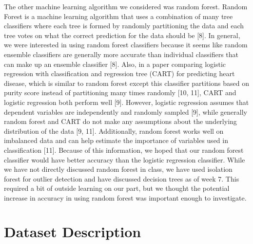 \documentclass[12pt]{article}
\begin{document}
The other machine learning algorithm we considered was random forest. Random Forest is a machine learning algorithm that uses a combination of many tree classifiers where each tree is formed by randomly partitioning the data and each tree votes on what the correct prediction for the data should be [8]. In general, we were interested in using random forest classifiers because it seems like random ensemble classifiers are generally more accurate than individual classifiers that can make up an ensemble classifier [8]. Also, in a paper comparing logistic regression with classification and regression tree (CART) for predicting heart disease, which is similar to random forest except this classifier partitions based on purity score instead of partitioning many times randomly [10, 11], CART and logistic regression both perform well [9]. However, logistic regression assumes that dependent variables are independently and randomly sampled [9], while generally random forest and CART do not make any assumptions about the underlying distribution of the data [9, 11]. Additionally, random forest works well on imbalanced data and can help estimate the importance of variables used in classification [11]. Because of this information, we hoped that our random forest classifier would have better accuracy than the logistic regression classifier. While we have not directly discussed random forest in class, we have used isolation forest for outlier detection and have discussed decision trees as of week 7. This required a bit of outside learning on our part, but we thought the potential increase in accuracy in using random forest was important enough to investigate.

\section*{Dataset Description}
\end{document}
